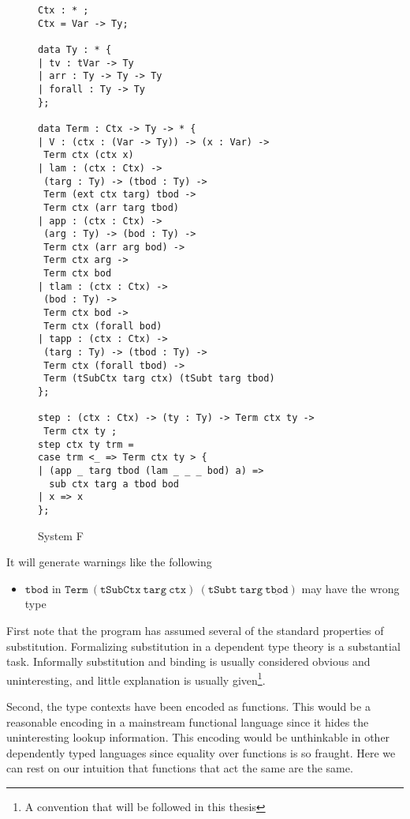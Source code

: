 \begin{figure}
\begin{lstlisting}[basicstyle={\ttfamily\tiny}]
Ctx : * ;
Ctx = Var -> Ty;
 
data Ty : * {
| tv : tVar -> Ty
| arr : Ty -> Ty -> Ty
| forall : Ty -> Ty
};
 
data Term : Ctx -> Ty -> * {
| V : (ctx : (Var -> Ty)) -> (x : Var) ->
 Term ctx (ctx x)
| lam : (ctx : Ctx) ->
 (targ : Ty) -> (tbod : Ty) ->
 Term (ext ctx targ) tbod ->
 Term ctx (arr targ tbod)
| app : (ctx : Ctx) ->
 (arg : Ty) -> (bod : Ty) ->
 Term ctx (arr arg bod) ->
 Term ctx arg ->
 Term ctx bod
| tlam : (ctx : Ctx) ->
 (bod : Ty) ->
 Term ctx bod ->
 Term ctx (forall bod)
| tapp : (ctx : Ctx) ->
 (targ : Ty) -> (tbod : Ty) ->
 Term ctx (forall tbod) ->
 Term (tSubCtx targ ctx) (tSubt targ tbod)
};
 
step : (ctx : Ctx) -> (ty : Ty) -> Term ctx ty ->
 Term ctx ty ;
step ctx ty trm =
case trm <_ => Term ctx ty > {
| (app _ targ tbod (lam _ _ _ bod) a) =>
  sub ctx targ a tbod bod
| x => x
};
\end{lstlisting}

\caption{System F}
\label{fig:ex-sysf}
\end{figure}

It will generate warnings like the following 
\begin{itemize}
\item $\mathtt{tbod}$ in $\mathtt{Term\ (tSubCtx\ targ\ ctx)\ (tSubt\ targ\ \underline{tbod})}$
may have the wrong type 
\end{itemize}
First note that the program has assumed several of the standard properties
of substitution. Formalizing substitution in a dependent type theory
is a substantial
task\cite{10.1145/3293880.3294101}.
Informally substitution and binding is usually considered obvious
and uninteresting, and little explanation is usually given\footnote{A convention that will be followed in this thesis}.

Second, the type contexts have been encoded as functions. This would
be a reasonable encoding in a mainstream functional language since
it hides the uninteresting lookup information. This encoding would
be unthinkable in other dependently typed languages since equality
over functions is so fraught. Here we can rest on our intuition that
functions that act the same are the same.

